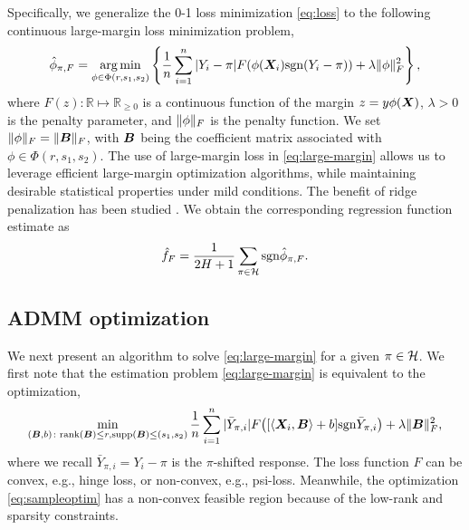 \documentclass[11pt]{article}
\theoremstyle{plain}
\theoremstyle{definition}
\def\sign{\textup{sgn}}
\def\rank{\textup{rank}}
\begin{document}
Specifically, we generalize the 0-1 loss minimization \eqref{eq:loss} to the following continuous large-margin loss minimization problem, 
\begin{align}\label{eq:large-margin}
\hat \phi_{\pi, F} = \argmin_{\phi \in\Phi(r,s_1,s_2)}\left\{ {1\over n}\sum_{i=1}^n |Y_i-\pi|F(\phi(\mX_i)\sign(Y_i-\pi))+ \lambda \FnormSize{}{\phi}^2\right\},
\end{align}
where $F(z)\colon \mathbb{R}\mapsto \mathbb{R}_{\geq 0}$ is a continuous function of the margin $z=y\phi(\bm X)$, $\lambda>0$ is the penalty parameter, and $\lVert\phi\rVert_F$ is the penalty function. We set $\lVert\phi\rVert_F=\lVert\bm B\rVert_F$, with $\bm B$ being the coefficient matrix associated with $\phi\in\Phi(r,s_1,s_2)$. The use of large-margin loss in \eqref{eq:large-margin} allows us to leverage efficient large-margin optimization algorithms, while maintaining desirable statistical properties under mild conditions. The benefit of ridge penalization has been studied \citep{shen2003psi}. We obtain the corresponding regression function estimate as
\begin{equation}\label{eq:stepfunction-large-margin}
\hat f_{F} = {1\over 2H+1}\sum_{\pi \in \tH} \sign \hat \phi_{\pi, F}.
\end{equation}



\subsection{ADMM optimization}

We next present an algorithm to solve \eqref{eq:large-margin} for a given $\pi\in\mathcal{H}$. We first note that the estimation problem \eqref{eq:large-margin} is equivalent to the optimization,
\begin{equation}\label{eq:sampleoptim}
\min_{\substack{(\mB,b)\colon  \rank(\mB)\leq r, \text{supp}(\mB)\leq (s_1,s_2)}}{1\over n}\sum_{i=1}^n|\bar Y_{\pi, i}| F\big( [\langle \mX_i,\mB \rangle+b] \sign \bar Y_{\pi, i}\big) + \lambda\FnormSize{}{\mB}^2,
\end{equation}
where we recall $\bar Y_{\pi, i}=Y_i-\pi$ is the $\pi$-shifted response. The loss function $F$ can be convex, e.g., hinge loss, or non-convex, e.g., psi-loss. Meanwhile, the optimization \eqref{eq:sampleoptim} has a non-convex feasible region because of the low-rank and sparsity constraints. 
\end{document}
